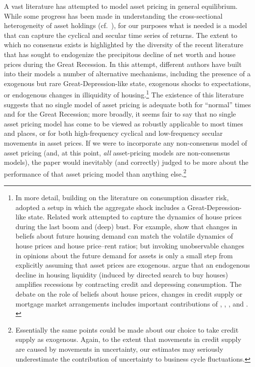 A vast literature has attempted to model asset pricing in general equilibrium.  While some progress has been made in understanding the cross-sectional heterogeneity of asset holdings (cf.\ \cite{gmAssetPricing}), for our purposes what is needed is a model that can capture the cyclical and secular time series of returns.  %
The extent to which no consensus exists is highlighted by the diversity of the recent literature that has sought to endogenize the precipitous decline of net worth and house prices during the Great Recession.  In this attempt, different authors have built into their models a number of alternative mechanisms, including the presence of a exogenous but rare Great-Depression-like state, exogenous shocks to expectations, or endogenous changes in illiquidity of housing.\footnote{In more detail, building on the literature on consumption disaster risk, \cite{glover:intergenRedistr} adopted a setup in which the aggregate shock includes a Great-Depression-like state. Related work attempted to capture the dynamics of house prices during the last boom and (deep) bust. For example, \cite{kmv:houseBoomBust} show that changes in beliefs about future housing demand can match the volatile dynamics of house prices and house price--rent ratios; but invoking unobservable changes in opinions about the future demand for assets is only a small step from explicitly assuming that asset prices are exogenous. \cite{garrigaHedlund} argue that an endogenous decline in housing liquidity (induced by directed search to buy houses) amplifies recessions by contracting credit and depressing consumption.  The debate on the role of beliefs about house prices, changes in credit supply or mortgage market arrangements includes important contributions of \cite{favilukis:housing}, \cite{kmv:houseBoomBust}, \cite{justPrimTamb:CredSupplyAndHouseBoom}, and \cite{garrigaHedlund}. \label{foot_housingLit}}  The existence of this literature suggests that no single model of asset pricing is adequate both for ``normal'' times and for the Great Recession; more broadly, it seems fair to say that no single asset pricing model has come to be viewed as robustly applicable to most times and places, or for both high-frequency cyclical and low-frequency secular movements in asset prices.  If we were to incorporate any non-consensus model of asset pricing (and, at this point, \textit{all} asset-pricing models are non-consensus models), the paper would inevitably (and correctly) judged to be more about the performance of that asset pricing model than anything else.\footnote{Essentially the same points could be made about our choice to take credit supply as exogenous.  Again, to the extent that movements in credit supply are caused by movements in uncertainty, our estimates may seriously underestimate the contribution of uncertainty to business cycle fluctuations.}

